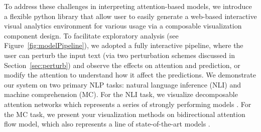 To address these challenges in interpreting attention-based models, 
we introduce a flexible python library that allow user to easily generate a web-based interactive visual analytics environment for various usage via a composable visualization component design.
%
To facilitate exploratory analysis (see Figure~\ref{fig:modelPipeline}), we adopted a fully interactive pipeline, where the user can perturb the input text (via two perturbation schemes discussed in Section~\ref{sec:perturb}) and observe the effects on attention and prediction, or modify the attention to understand how it affect the predictions.
%
We demonstrate our system on two primary NLP tasks: natural language
inference (NLI) and machine comprehension (MC). For the NLI task, we visualize
decomposable attention networks which represents a series of strongly performing models \cite{Parikh2016}.
For the MC task, we present your visualization methods on bidirectional attention flow model,
which also represents a line of state-of-the-art models \cite{Seo2016}.




